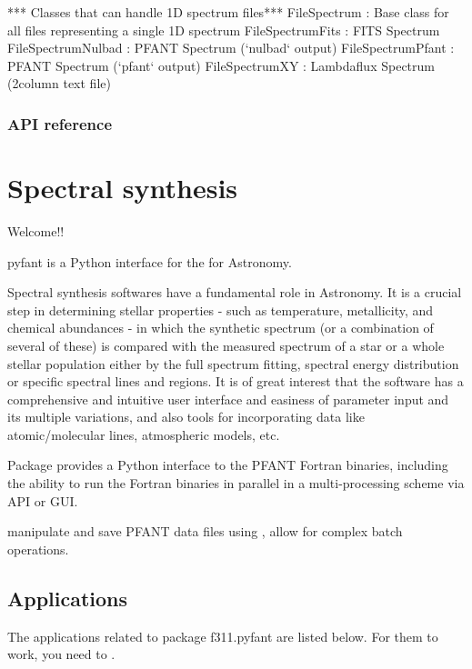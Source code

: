 \documentclass[letterpaper,10pt,english]{sphinxmanual}
\begin{document}
\begin{sphinxVerbatim}[commandchars=\\\{\}]
*** Classes that can handle 1D spectrum files***
FileSpectrum             : Base class for all files representing a single 1D spectrum
FileSpectrumFits         : FITS Spectrum
FileSpectrumNulbad       : PFANT Spectrum ({}`nulbad{}` output)
FileSpectrumPfant        : PFANT Spectrum ({}`pfant{}` output)
FileSpectrumXY           : \PYGZdq{}Lambda\PYGZhy{}flux\PYGZdq{} Spectrum (2\PYGZhy{}column text file)
\end{sphinxVerbatim}


\subsection{API reference}
\label{\detokenize{f3110:api-reference}}


\chapter{Spectral synthesis}
\label{\detokenize{pyfant::doc}}\label{\detokenize{pyfant:spectral-synthesis}}
Welcome!!

pyfant is a Python interface for the  for Astronomy.

Spectral synthesis softwares have a fundamental role in Astronomy.
It is a crucial step in determining stellar properties
- such as temperature, metallicity, and chemical abundances -
in which the synthetic spectrum (or a combination of several of these) is compared with the
measured spectrum of a star or a whole stellar population either by the full spectrum fitting,
spectral energy distribution or specific spectral lines and regions.
It is of great interest that the software has a comprehensive and intuitive user interface and
easiness of parameter input and its multiple variations, and also tools for incorporating data
like atomic/molecular lines, atmospheric models, etc.

Package  provides a Python interface to the PFANT Fortran binaries, including the
ability to run the Fortran binaries in parallel in a multi-processing scheme via API or GUI.

manipulate and save PFANT data files using , allow for complex batch operations.


\section{Applications}
\label{\detokenize{pyfant:applications}}
The applications related to package f311.pyfant are listed below. For them to work, you need to
.
\end{document}
